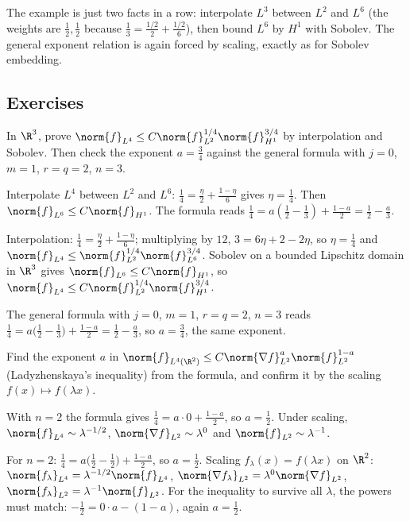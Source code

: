The example is just two facts in a row: interpolate $L^3$ between $L^2$ and $L^6$ (the weights are $\frac12,\frac12$ because $\frac13 = \frac{1/2}{2} + \frac{1/2}{6}$), then bound $L^6$ by $H^1$ with Sobolev. The general exponent relation is again forced by scaling, exactly as for Sobolev embedding.

\subsection*{Exercises}

\begin{exercise}
  In $\R^3$, prove $\norm{f}_{L^4} \le C\norm{f}_{L^2}^{1/4}\norm{f}_{H^1}^{3/4}$ by interpolation and Sobolev. Then check the exponent $a = \frac34$ against the general formula with $j = 0$, $m = 1$, $r = q = 2$, $n = 3$.
  \begin{hint}
    Interpolate $L^4$ between $L^2$ and $L^6$: $\frac14 = \frac{\eta}{2} + \frac{1-\eta}{6}$ gives $\eta = \frac14$. Then $\norm{f}_{L^6} \le C\norm{f}_{H^1}$. The formula reads $\frac14 = a(\frac12 - \frac13) + \frac{1-a}{2} = \frac12 - \frac a3$.
  \end{hint}
  \begin{solution}
    Interpolation: $\frac14 = \frac\eta2 + \frac{1-\eta}{6}$; multiplying by $12$, $3 = 6\eta + 2 - 2\eta$, so $\eta = \frac14$ and $\norm{f}_{L^4} \le \norm{f}_{L^2}^{1/4}\norm{f}_{L^6}^{3/4}$. Sobolev on a bounded Lipschitz domain in $\R^3$ gives $\norm{f}_{L^6} \le C\norm{f}_{H^1}$, so $\norm{f}_{L^4} \le C\norm{f}_{L^2}^{1/4}\norm{f}_{H^1}^{3/4}$.

    The general formula with $j = 0$, $m = 1$, $r = q = 2$, $n = 3$ reads $\frac14 = a\big(\frac12 - \frac13\big) + \frac{1-a}{2} = \frac12 - \frac a3$, so $a = \frac34$, the same exponent.
  \end{solution}
\end{exercise}

\begin{exercise}
  Find the exponent $a$ in $\norm{f}_{L^4(\R^2)} \le C\norm{\nabla f}_{L^2}^{a}\norm{f}_{L^2}^{1-a}$ (Ladyzhenskaya's inequality) from the formula, and confirm it by the scaling $f(x) \mapsto f(\lambda x)$.
  \begin{hint}
    With $n = 2$ the formula gives $\frac14 = a\cdot 0 + \frac{1-a}{2}$, so $a = \frac12$. Under scaling, $\norm{f}_{L^4} \sim \lambda^{-1/2}$, $\norm{\nabla f}_{L^2} \sim \lambda^0$ and $\norm{f}_{L^2} \sim \lambda^{-1}$.
  \end{hint}
  \begin{solution}
    For $n = 2$: $\frac14 = a\big(\frac12 - \frac12\big) + \frac{1-a}{2}$, so $a = \frac12$. Scaling $f_\lambda(x) = f(\lambda x)$ on $\R^2$: $\norm{f_\lambda}_{L^4} = \lambda^{-1/2}\norm{f}_{L^4}$, $\norm{\nabla f_\lambda}_{L^2} = \lambda^{0}\norm{\nabla f}_{L^2}$, $\norm{f_\lambda}_{L^2} = \lambda^{-1}\norm{f}_{L^2}$. For the inequality to survive all $\lambda$, the powers must match: $-\frac12 = 0\cdot a - (1-a)$, again $a = \frac12$.
  \end{solution}
\end{exercise}

